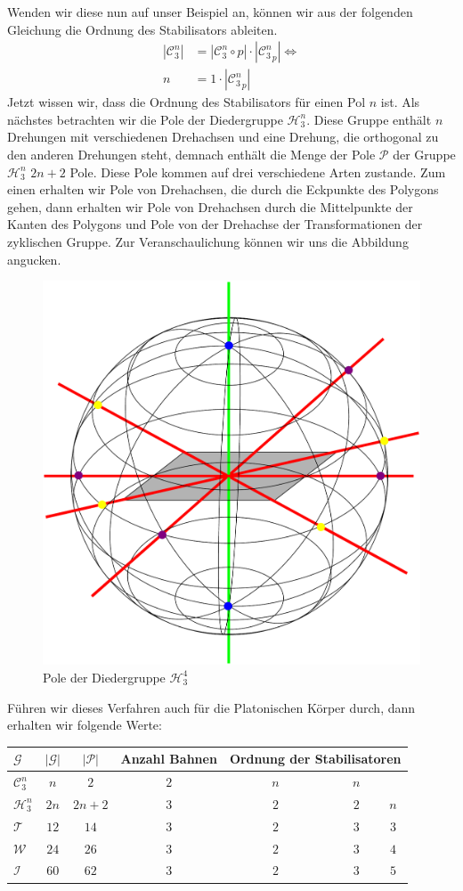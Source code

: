 Wenden wir diese nun auf unser Beispiel an, können wir aus der folgenden Gleichung die Ordnung des Stabilisators ableiten.
\begin{align*}
	 |\mathcal{C}_3^n| &= |\mathcal{C}_3^n \circ p| \cdot |{\mathcal{C}_3^n}_p| \Leftrightarrow\\
	 n &= 1 \cdot |{\mathcal{C}_3^n}_p|
\end{align*}
Jetzt wissen wir, dass die Ordnung des Stabilisators für einen Pol $n$ ist. Als nächstes betrachten wir die Pole der Diedergruppe $\mathcal{H}_3^n$. Diese Gruppe enthält $n$ Drehungen mit verschiedenen Drehachsen und eine Drehung, die orthogonal zu den anderen Drehungen steht, demnach enthält die Menge der Pole $\mathcal{P}$ der Gruppe $\mathcal{H}_3^n$ $2n+2$ Pole. Diese Pole kommen auf drei verschiedene Arten zustande. Zum einen erhalten wir Pole von Drehachsen, die durch die Eckpunkte des Polygons gehen, dann erhalten wir Pole von Drehachsen durch die Mittelpunkte der Kanten des Polygons und Pole von der Drehachse der Transformationen der zyklischen Gruppe. Zur Veranschaulichung können wir uns die Abbildung angucken.
\begin{figure}[H]
\centering
\includegraphics[width=0.5\linewidth]{grafiken/pole_diedergruppe}
\caption{Pole der Diedergruppe $\mathcal{H}_3^4$}
\label{fig:pole_diedergruppe}
\end{figure}
Führen wir dieses Verfahren auch für die Platonischen Körper durch, dann erhalten wir folgende Werte:
\begin{center}
	\begin{tabular}{l|cccccc}
		$\mathcal{G}$ & $|\mathcal{G}|$ & $|\mathcal{P}|$ & Anzahl Bahnen & \multicolumn{3}{c}{Ordnung der Stabilisatoren}\\
		\hline
		$\mathcal{C}^n_3$ & $n$ & $2$ & $2$ & \ \ \ \ \ $n$ & \ \ \ \ \ \ $n$ & \\
		$\mathcal{H}^n_3$ & $2n$ & $2n + 2$ & $3$ & \ \ \ \ \ $2$ & \ \ \ \ \ \ $2$ & $n$\\
		$\mathcal{T}$ & $12$ & $14$ & $3$ & \ \ \ \ \ $2$ & \ \ \ \ \ \ $3$ & $3$\\
		$\mathcal{W}$ & $24$ & $26$ & $3$ & \ \ \ \ \  $2$ & \ \ \ \ \ \ $3$ & $4$\\
		$\mathcal{I}$ & $60$ & $62$ & $3$ & \ \ \ \ \ $2$ & \ \ \ \ \ \ $3$ & $5$
	\end{tabular}
\end{center}
